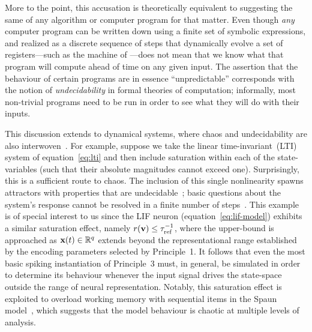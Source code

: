 More to the point, this accusation is theoretically equivalent to suggesting the same of any algorithm or computer program for that matter.
Even though \emph{any} computer program can be written down using a finite set of symbolic expressions, and realized as a discrete sequence of steps that dynamically evolve a set of registers---such as the machine of \citet{turing1938computable}---does not mean that we know what that program will compute ahead of time on any given input.
The assertion that the behaviour of certain programs are in essence ``unpredictable'' corresponds with the notion of \emph{undecidability} in formal theories of computation; informally, most non-trivial programs need to be run in order to see what they will do with their inputs.

This discussion extends to dynamical systems, where chaos and undecidability are also interwoven~\citep{moore1991generalized}.
For example, suppose we take the linear time-invariant~(LTI) system of equation~\ref{eq:lti} and then include saturation within each of the state-variables (such that their absolute magnitudes cannot exceed one).
Surprisingly, this is a sufficient route to chaos.
The inclusion of this single nonlinearity spawns attractors with properties that are undecidable~\citep{blondel2001stability}; basic questions about the system's response cannot be resolved in a finite number of steps~\citep{bennett1990undecidable}.
This example is of special interest to us since the LIF neuron (equation~\ref{eq:lif-model}) exhibits a similar saturation effect, namely $r(\mathbf{v}) \le \tau_\text{ref}^{-1}$, where the upper-bound is approached as $\mathbf{x}(t) \in \mathbb{R}^q$ extends beyond the representational range established by the encoding parameters selected by Principle~1.
It follows that even the most basic spiking instantiation of Principle~3 must, in general, be simulated in order to determine its behaviour whenever the input signal drives the state-space outside the range of neural representation.
Notably, this saturation effect is exploited to overload working memory with sequential items in the Spaun model~\citep{eliasmith2012}, which suggests that the model behaviour is chaotic at multiple levels of analysis.


